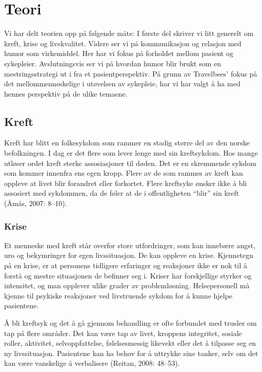 \chapter{Teori}

Vi har delt teorien opp på følgende måte: I første del skriver vi litt generelt
om kreft, krise og livskvalitet. Videre ser vi på kommunikasjon og relasjon med
humor som virkemiddel. Her har vi fokus på forholdet mellom pasient og
sykepleier. Avslutningsvis ser vi på hvordan humor blir brukt som en
mestringsstrategi ut i fra et pasientperspektiv. På grunn av Travelbees’ fokus
på det mellommenneskelige i utøvelsen av sykepleie, har vi har valgt å ha med
hennes perspektiv på de ulike temaene.

\section{Kreft}

Kreft har blitt en folkesykdom som rammer en stadig større del av den norske
befolkningen.  I dag er det flere som lever lenge med sin kreftsykdom. Hos
mange utløser ordet kreft sterke assosiasjoner til døden. Det er en skremmende
sykdom som kommer innenfra ens egen kropp. Flere av de som rammes av kreft kan
oppleve at livet blir forandret eller forkortet. Flere kreftsyke ønsker ikke å
bli assosiert med sykdommen, da de føler at de i offentligheten “blir” sin
kreft (Åmås, 2007: 8--10).

\subsection{Krise}

Et menneske med kreft står overfor store utfordringer, som kan innebære angst,
uro og bekymringer for egen livssituasjon. De kan oppleve en krise. Kjennetegn
på en krise, er at personens tidligere erfaringer og reaksjoner ikke er nok til
å forstå og mestre situasjonen de befinner seg i. Kriser har forskjellige
styrker og intensitet, og man opplever ulike grader av problemløsning.
Helsepersonell må kjenne til psykiske reaksjoner ved livstruende sykdom for å
kunne hjelpe pasientene.

Å bli kreftsyk og det å gå gjennom behandling er ofte forbundet med trusler om
tap på flere områder. Det kan være tap av livet, kroppens integritet, sosiale
roller, aktivitet, selvoppfattelse, følelsesmessig likevekt eller det å
tilpasse seg en ny livssituasjon. Pasientene kan ha behov for å uttrykke sine
tanker, selv om det kan være vanskelige å verbalisere (Reitan, 2008: 48--53).

